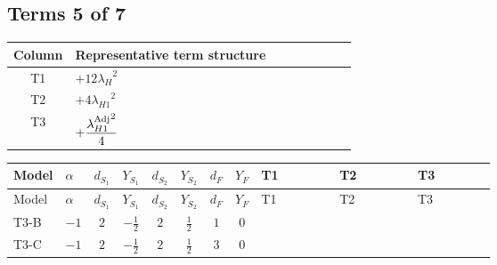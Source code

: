 \documentclass[8pt]{article}
\begin{document}
\begin{landscape}
\subsection*{Terms 5 of 7}
\begin{center}
\begin{tabular}{@{}c >{\raggedright\arraybackslash}p{0.82\linewidth}@{}}
\toprule
Column & Representative term structure \\
\midrule
T1 & \(\displaystyle +12 {\lambda_H}^2\) \\
\midrule
T2 & \(\displaystyle +4 {\lambda_{H1}}^2\) \\
\midrule
T3 & \(\displaystyle +\frac{{\lambda_{H1}^{\rm Adj}}^2}{4}\) \\
\midrule
\bottomrule
\end{tabular}
\end{center}
\smallskip
\tiny
\begin{longtable}{@{}llcccccc >{\raggedright\arraybackslash}p{0.21\linewidth} >{\raggedright\arraybackslash}p{0.21\linewidth} >{\raggedright\arraybackslash}p{0.21\linewidth}@{}}
\toprule
Model & $\alpha$ & $d_{S_1}$ & $Y_{S_1}$ & $d_{S_2}$ & $Y_{S_2}$ & $d_F$ & $Y_F$ & T1 & T2 & T3 \\
\midrule
\endfirsthead
\toprule
Model & $\alpha$ & $d_{S_1}$ & $Y_{S_1}$ & $d_{S_2}$ & $Y_{S_2}$ & $d_F$ & $Y_F$ & T1 & T2 & T3 \\
\midrule
\endhead
T3-B & $-1$ & $2$ & $-\frac{1}{2}$ & $2$ & $\frac{1}{2}$ & $1$ & $0$ & \scriptsize\adjustbox{max width=\linewidth}{$\begin{gathered} +12 {\lambda_H}^2\end{gathered}$} & \scriptsize\adjustbox{max width=\linewidth}{$\begin{gathered} +4 {\lambda_{H1}}^2\end{gathered}$} & \scriptsize\adjustbox{max width=\linewidth}{$\begin{gathered} +\frac{{\lambda_{H1}^{\rm Adj}}^2}{4}\end{gathered}$} \\
\midrule
T3-C & $-1$ & $2$ & $-\frac{1}{2}$ & $2$ & $\frac{1}{2}$ & $3$ & $0$ & \scriptsize\adjustbox{max width=\linewidth}{$\begin{gathered} +12 {\lambda_H}^2\end{gathered}$} & \scriptsize\adjustbox{max width=\linewidth}{$\begin{gathered} +4 {\lambda_{H1}}^2\end{gathered}$} & \scriptsize\adjustbox{max width=\linewidth}{$\begin{gathered} +\frac{{\lambda_{H1}^{\rm Adj}}^2}{4}\end{gathered}$} \\

\end{longtable}
\end{landscape}
\end{document}

